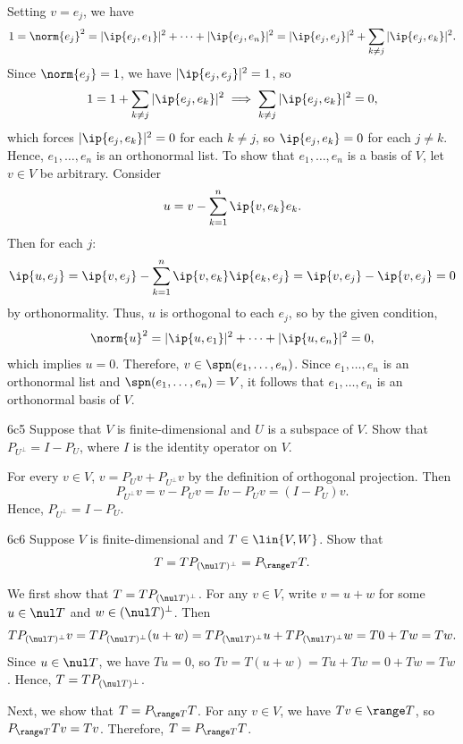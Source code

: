 \begin{sol}
    Setting $v = e_j$, we have
    \[
        1 = \norm{e_j}^2 = |\ip{e_j, e_1}|^2 + \cdots + |\ip{e_j, e_n}|^2 = |\ip{e_j, e_j}|^2 + \sum_{k \neq j} |\ip{e_j, e_k}|^2.
    \]
    Since $\norm{e_j} = 1$, we have $|\ip{e_j, e_j}|^2 = 1$, so
    \[
        1 = 1 + \sum_{k \neq j} |\ip{e_j, e_k}|^2 \implies \sum_{k \neq j} |\ip{e_j, e_k}|^2 = 0,
    \]
    which forces $|\ip{e_j, e_k}|^2 = 0$ for each $k \neq j$, so $\ip{e_j, e_k} = 0$ for each $j \neq k$.
    Hence, $e_1, \ldots, e_n$ is an orthonormal list.
    To show that $e_1, \ldots, e_n$ is a basis of $V$, let $v \in V$ be arbitrary.
    Consider
    \[
        u = v - \sum_{k=1}^{n} \ip{v, e_k} e_k.
    \]
    Then for each $j$:
    \[
        \ip{u, e_j} = \ip{v, e_j} - \sum_{k=1}^{n} \ip{v, e_k} \ip{e_k, e_j} = \ip{v, e_j} - \ip{v, e_j} = 0
    \]
    by orthonormality.
    Thus, $u$ is orthogonal to each $e_j$, so by the given condition,
    \[
        \norm{u}^2 = |\ip{u, e_1}|^2 + \cdots + |\ip{u, e_n}|^2 = 0,
    \]
    which implies $u = 0$.
    Therefore, $v \in \spn(e_1, \ldots, e_n)$.
    Since $e_1, \ldots, e_n$ is an orthonormal list and $\spn(e_1, \ldots, e_n) = V$, it follows that $e_1, \ldots, e_n$ is an orthonormal basis of $V$.
\end{sol}

\begin{exercise}{6c5}
    Suppose that $V$ is finite-dimensional and $U$ is a subspace of $V$.
    Show that $P_{U^\perp} = I - P_U$, where $I$ is the identity operator on $V$.
\end{exercise}

\begin{sol}
    For every $v \in V$, $v = P_U v + P_{U^\perp} v$ by the definition of orthogonal projection.
    Then
    \[
        P_{U^\perp} v = v - P_U v = Iv - P_U v = (I - P_U)v.
    \]
    Hence, $P_{U^\perp} = I - P_U$.
\end{sol}

\begin{exercise}{6c6}
    Suppose $V$ is finite-dimensional and $T \in \lin{V, W}$.
    Show that
    \[
        T = TP_{(\nul T)^\perp} = P_{\range T}T.
    \]
\end{exercise}

\begin{sol}
    We first show that $T = TP_{(\nul T)^\perp}$.
    For any $v \in V$, write $v = u + w$ for some $u \in \nul T$ and $w \in (\nul T)^\perp$.
    Then
    \[
        TP_{(\nul T)^\perp} v = TP_{(\nul T)^\perp}(u + w) = TP_{(\nul T)^\perp} u + TP_{(\nul T)^\perp} w = T0 + Tw = Tw.
    \]
    Since $u \in \nul T$, we have $Tu = 0$, so $Tv = T(u + w) = Tu + Tw = 0 + Tw = Tw$.
    Hence, $T = TP_{(\nul T)^\perp}$.

    Next, we show that $T = P_{\range T}T$.
    For any $v \in V$, we have $Tv \in \range T$, so $P_{\range T}Tv = Tv$.
    Therefore, $T = P_{\range T}T$.
\end{sol}

